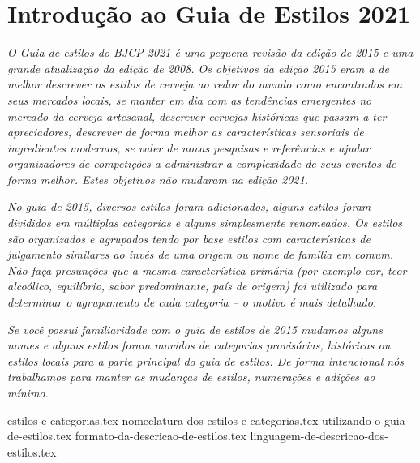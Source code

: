 \clearpage
{}
\divisorLine
\section*{Introdução ao Guia de Estilos 2021}
\textit{O Guia de estilos do BJCP 2021 é uma pequena revisão da edição de 2015 e uma grande atualização da edição de 2008. Os objetivos da edição 2015 eram a de melhor descrever os estilos de cerveja ao redor do mundo como encontrados em seus mercados locais, se manter em dia com as tendências emergentes no mercado da cerveja artesanal, descrever cervejas históricas que passam a ter apreciadores, descrever de forma melhor as características sensoriais de ingredientes modernos, se valer de novas pesquisas e referências e ajudar organizadores de competições a administrar a complexidade de seus eventos de forma melhor. Estes objetivos não mudaram na edição 2021.}

\textit{No guia de 2015, diversos estilos foram adicionados, alguns estilos foram divididos em múltiplas categorias e alguns simplesmente renomeados. Os estilos são organizados e agrupados tendo por base estilos com características de julgamento similares ao invés de uma origem ou nome de família em comum. Não faça presunções que a mesma característica primária (por exemplo cor, teor alcoólico, equilíbrio, sabor predominante, país de origem) foi utilizado para determinar o agrupamento de cada categoria – o motivo é mais detalhado.}

\textit{Se você possui familiaridade com o guia de estilos de 2015 mudamos alguns nomes e alguns estilos foram movidos de categorias provisórias, históricas ou estilos locais para a parte principal do guia de estilos. De forma intencional nós trabalhamos para manter as mudanças de estilos, numerações e adições ao mínimo.}

\begin{multicols*}{2}
{estilos-e-categorias.tex}
{nomeclatura-dos-estilos-e-categorias.tex}
{utilizando-o-guia-de-estilos.tex}
{formato-da-descricao-de-estilos.tex}
{linguagem-de-descricao-dos-estilos.tex}
\end{multicols*}